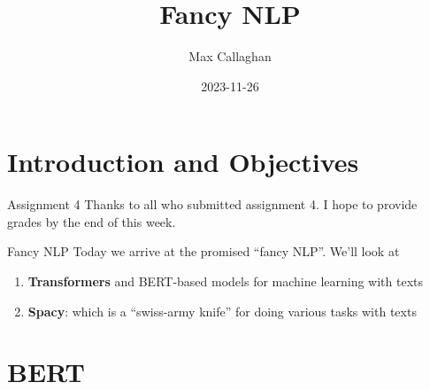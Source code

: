 \documentclass[
  10pt,
  ignorenonframetext,
  aspectratio=169]{beamer}
\title{Fancy NLP}
\author{Max Callaghan}
\date{2023-11-26}
\begin{document}
\frame{\titlepage}

\hypertarget{introduction-and-objectives}{%
\section{Introduction and
Objectives}\label{introduction-and-objectives}}

\begin{frame}{Assignment 4}
\protect\hypertarget{assignment-4}{}
Thanks to all who submitted assignment 4. I hope to provide grades by
the end of this week.
\end{frame}

\begin{frame}{Fancy NLP}
\protect\hypertarget{fancy-nlp}{}
Today we arrive at the promised ``fancy NLP''. We'll look at

\begin{enumerate}
  \item<1->\textbf{Transformers} and BERT-based models for machine learning with texts
  \item<2->\textbf{Spacy}: which is a ``swiss-army knife'' for doing various tasks with texts
\end{enumerate}


\end{frame}

\hypertarget{bert}{%
\section{BERT}\label{bert}}
\end{document}
